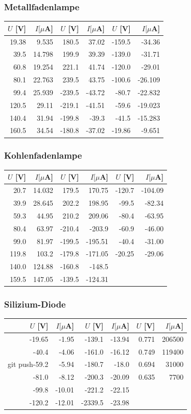 \documentclass[12pt,a4paper]{article}
\begin{document}
\subsubsection*{Metallfadenlampe}
\begin{tabular}{|r|r|r|r|r|r|}
\hline
$U$ [V]&$I [\mu $A]&$U$ [V]&$I [\mu $A]&$U$ [V]&$I [\mu $A]\\
\hline
19.38&9.535&180.5&37.02&-159.5&-34.36\\
39.5&14.798&199.9&39.39&-139.0&-31.71\\
60.8&19.254&221.1&41.74&-120.0&-29.01\\
80.1&22.763&239.5&43.75&-100.6&-26.109\\
99.4&25.939&-239.5&-43.72&-80.7&-22.832\\
120.5&29.11&-219.1&-41.51&-59.6&-19.023\\
140.4&31.94&-199.8&-39.3&-41.5&-15.283\\
160.5&34.54&-180.8&-37.02&-19.86&-9.651\\
\hline
\end{tabular}

\subsubsection*{Kohlenfadenlampe}
\begin{tabular}{|r|r|r|r|r|r|}
\hline
$U$ [V]&$I [\mu $A]&$U$ [V]&$I [\mu $A]&$U$ [V]&$I [\mu $A]\\
\hline
20.7&14.032&179.5&170.75&-120.7&-104.09\\
39.9&28.645&202.2&198.95&-99.5&-82.34\\
59.3&44.95&210.2&209.06&-80.4&-63.95\\
80.4&63.97&-210.4&-203.9&-60.9&-46.00\\
99.0&81.97&-199.5&-195.51&-40.4&-31.00\\
119.8&103.2&-179.8&-171.05&-20.25&-29.06\\
140.0&124.88&-160.8&-148.5&&\\
159.5&147.05&-139.5&-124.31&&\\
\hline
\end{tabular}

\subsubsection*{Silizium-Diode}
\begin{tabular}{|r|r|r|r|r|r|}
\hline
$U$ [V]&$I [\mu $A]&$U$ [V]&$I [\mu $A]&$U$ [V]&$I [\mu $A]\\
\hline
-19.65&-1.95&-139.1&-13.94&0.771&206500\\
-40.4&-4.06&-161.0&-16.12&0.749&119400\\
git push-59.2&-5.94&-180.7&-18.0&0.694&31000\\
-81.0&-8.12&-200.3&-20.09&0.635&7700\\
-99.8&-10.01&-221.2&-22.15&&\\
-120.2&-12.01&-2339.5&-23.98&&\\
\hline
\end{tabular}
\end{document}
